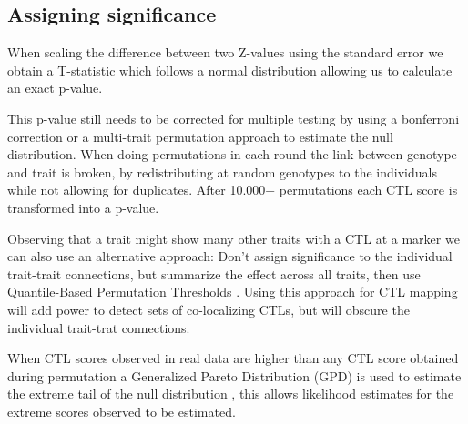   \subsection{Assigning significance}
  
  When scaling the difference between two Z-values using the standard error we obtain a T-statistic which follows a 
  normal distribution \cite{Biometry:1995} allowing us to calculate an exact p-value.

  This p-value still needs to be corrected for multiple testing by using a bonferroni correction or a multi-trait 
  permutation approach \cite{Breitling:2008a} to estimate the null distribution. When doing permutations in each round 
  the link between genotype and trait is broken, by redistributing at random genotypes to the individuals while not 
  allowing for duplicates. After 10.000+ permutations each CTL score is transformed into a p-value.

  Observing that a trait might show many other traits with a CTL at a marker we can also use an alternative approach: 
  Don't assign significance to the individual trait-trait connections, but summarize the effect across all traits, 
  then use Quantile-Based Permutation Thresholds \cite{Neto:2012}. Using this approach for CTL mapping will add power 
  to detect sets of co-localizing CTLs, but will obscure the individual trait-trat connections.

  When CTL scores observed in real data are higher than any CTL score obtained during permutation a Generalized 
  Pareto Distribution (GPD) is used to estimate the extreme tail of the null distribution \cite{Knijnenburg:2009}, 
  this allows likelihood estimates for the extreme scores observed to be estimated.
  
